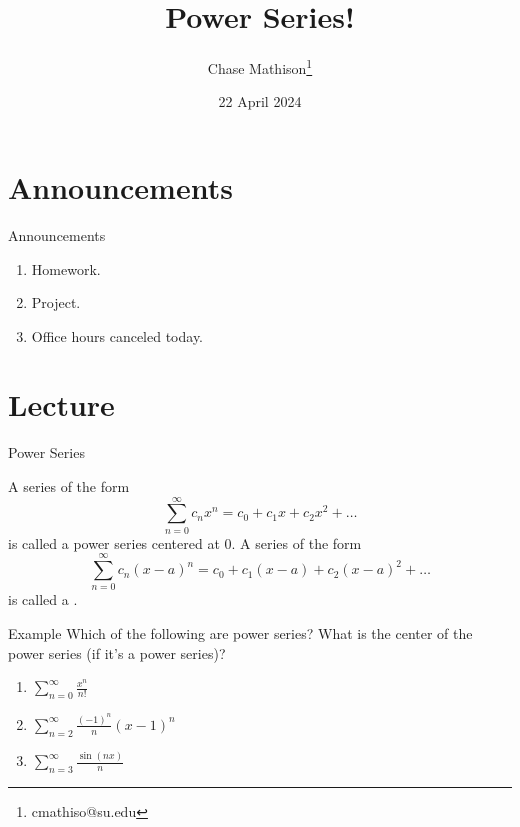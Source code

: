 \documentclass[presentation]{beamer}
\institute[SU]{Shenandoah University}
\author{Chase Mathison\thanks{cmathiso@su.edu}}
\date{22 April 2024}
\title{Power Series!}
\begin{document}
\maketitle

\section{Announcements}
\label{sec:org62e40d1}
\begin{frame}[label={sec:orgeda6264}]{Announcements}
\begin{enumerate}
\item Homework.
\item Project.
\item Office hours canceled today.
\end{enumerate}
\end{frame}

\section{Lecture}
\label{sec:orgec690ff}
\begin{frame}[label={sec:org92dc4eb}]{Power Series}
\begin{definition}
A series of the form \[\sum_{n=0}^\infty c_n x^n = c_0 + c_1x+c_2x^2 +
\ldots\] is called a \alert{power series centered at 0}. A series of the form
\[\sum_{n=0}^\infty c_n (x-a)^n = c_0 + c_1 (x-a) + c_2 (x-a)^2+\ldots\] is
called a \uline{\hspace*{1in}}.
\end{definition}
\end{frame}

\begin{frame}[label={sec:org102c5f3}]{Example}
Which of the following are power series? What is the center of the power
series (if it's a power series)?

\begin{enumerate}
\item \(\sum_{n=0}^\infty \frac{x^n}{n!}\)

\item \(\sum_{n=2}^\infty \frac{(-1)^n}{n} (x-1)^n\)

\item \(\sum_{n=3}^\infty \frac{\sin(n x)}{n}\)
\end{enumerate}

\vspace{10in}   
\end{frame}
\end{document}
